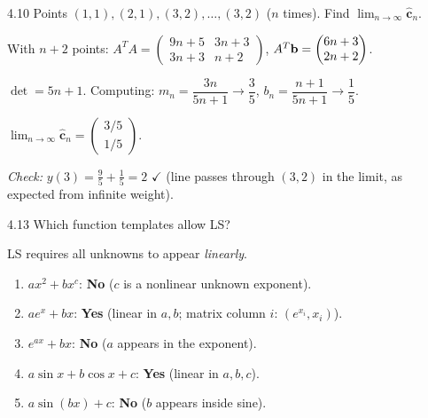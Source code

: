 \begin{exercise}{4.10}
Points $(1,1),(2,1),(3,2),\ldots,(3,2)$ ($n$ times). Find $\lim_{n\to\infty}\hat{\mathbf{c}}_n$.
\end{exercise}
\begin{solution}
With $n+2$ points: $A^TA=\begin{pmatrix}9n+5&3n+3\\3n+3&n+2\end{pmatrix}$, $A^T\mathbf{b}=\begin{pmatrix}6n+3\\2n+2\end{pmatrix}$.

$\det=5n+1$. Computing: $m_n=\dfrac{3n}{5n+1}\to\dfrac{3}{5}$, $b_n=\dfrac{n+1}{5n+1}\to\dfrac{1}{5}$.

$\lim_{n\to\infty}\hat{\mathbf{c}}_n = \begin{pmatrix}3/5\\1/5\end{pmatrix}$.

\textit{Check:} $y(3)=\tfrac{9}{5}+\tfrac{1}{5}=2$ $\checkmark$ (line passes through $(3,2)$ in the limit, as expected from infinite weight).
\end{solution}

\begin{exercise}{4.13}
Which function templates allow LS?
\end{exercise}
\begin{solution}
LS requires all unknowns to appear \emph{linearly}.
\begin{enumerate}[label=(\alph*)]
  \item $ax^2+bx^c$: \textbf{No} ($c$ is a nonlinear unknown exponent).
  \item $ae^x+bx$: \textbf{Yes} (linear in $a,b$; matrix column $i$: $(e^{x_i},x_i)$).
  \item $e^{ax}+bx$: \textbf{No} ($a$ appears in the exponent).
  \item $a\sin x+b\cos x+c$: \textbf{Yes} (linear in $a,b,c$).
  \item $a\sin(bx)+c$: \textbf{No} ($b$ appears inside sine).
\end{enumerate}
\end{solution}
